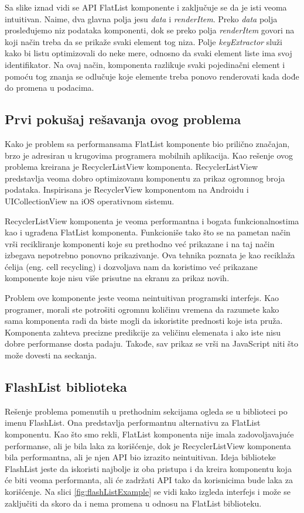 \documentclass[12pt,oneside]{memoir}
\begin{document}
Sa slike iznad vidi se API FlatList komponente i zaključuje se da je isti veoma intuitivan. Naime, dva glavna polja jesu \textit{data} i \textit{renderItem}. Preko \textit{data} polja prosleđujemo niz podataka komponenti, dok se preko polja \textit{renderItem} govori na koji način treba da se prikaže svaki element tog niza. Polje \textit{keyExtractor} služi kako bi listu optimizovali do neke mere, odnosno da svaki element liste ima svoj identifikator. Na ovaj način, komponenta razlikuje svaki pojedinačni element i pomoću tog znanja se odlučuje koje elemente treba ponovo renderovati kada dođe do promena u podacima.

\subsection{Prvi pokušaj rešavanja ovog problema}

Kako je problem sa performansama FlatList komponente bio prilično značajan, brzo je adresiran u krugovima programera mobilnih aplikacija. Kao rešenje ovog problema kreirana je RecyclerListView komponenta\cite{RecyclerListView}. RecyclerListView predstavlja veoma dobro optimizovanu komponentu za prikaz ogromnog broja podataka. Inspirisana je RecyclerView komponentom na Androidu i UICollectionView na iOS operativnom sistemu. 


RecyclerListView komponenta je veoma performantna i bogata funkcionalnostima kao i ugrađena FlatList komponenta. Funkcioniše tako što se na pametan način vrši recikliranje komponenti koje su prethodno već prikazane i na taj način izbegava nepotrebno ponovno prikazivanje. Ova tehnika poznata je kao reciklaža ćelija (eng. cell recycling) i dozvoljava nam da koristimo već prikazane komponente koje nisu više prisutne na ekranu za prikaz novih.


Problem ove komponente jeste veoma neintuitivan programski interfejs. Kao programer, morali ste potrošiti ogromnu količinu vremena da razumete kako sama komponenta radi da biste mogli da iskoristite prednosti koje ista pruža. Komponenta zahteva precizne predikcije za veličinu elemenata i ako iste nisu dobre performanse dosta padaju. Takođe, sav prikaz se vrši na JavaScript niti što može dovesti na seckanja.

\subsection{FlashList biblioteka}

Rešenje problema pomenutih u prethodnim sekcijama ogleda se u biblioteci po imenu FlashList\cite{FlashList}. Ona predstavlja performantnu alternativu za FlatList komponentu. Kao što smo rekli, FlatList komponenta nije imala zadovoljavajuće performanse, ali je bila laka za korišćenje, dok je RecyclerListView komponenta bila performantna, ali je njen API bio izrazito neintuitivan. Ideja biblioteke FlashList jeste da iskoristi najbolje iz oba pristupa i da kreira komponentu koja će biti veoma performanta, ali će zadržati API tako da korisnicima bude laka za korišćenje. Na slici \ref{fig:flashListExample} se vidi kako izgleda interfejs i može se zaključiti da skoro da i nema promena u odnosu na FlatList biblioteku.
\end{document}
